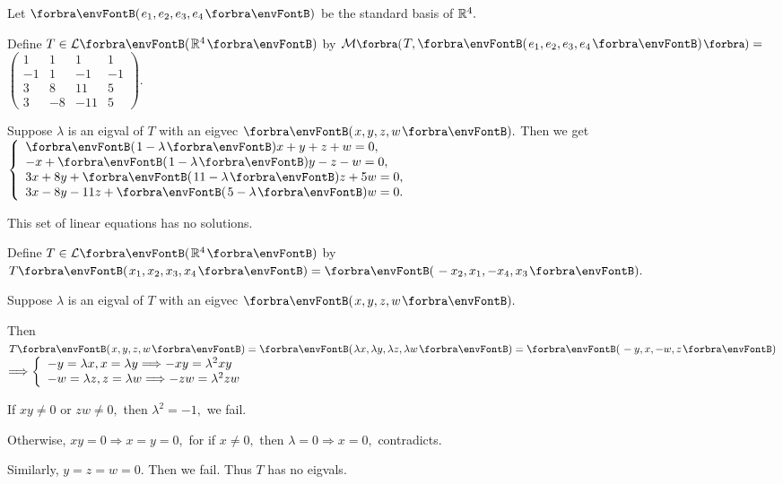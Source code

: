 \documentclass[a4paper, 11pt, UTF8]{article}
\begin{document}
\begin{large}
\par\quad
Let $\Par{e_1,e_2,e_3,e_4}$ be the standard basis of $\Rbb^4.$\vspace{-8pt}\par\quad
Define $T\in\Lm{\Rbb^4}$ by $\Mt[\BigPar]{T,\Par{e_1,e_2,e_3,e_4}}=${\small$\begin{pmatrix}
		1 & 1 & 1 & 1\\
		-1 & 1 & -1 & -1\\
		3 & 8 & 11 & 5\\
		3 & -8 & -11 & 5
	\end{pmatrix}.$}\vspace{-15pt}\par\quad
Suppose $\lambda$ is an eigval of $T$ with an eigvec $\Par{x,y,z,w}.$ Then we get {\small$\MathLeftBrace{l}{
		\Par{1-\lambda}x+y+z+w=0,\\
		-x+\Par{1-\lambda}y-z-w=0,\\
		3x+8y+\Par{11-\lambda}z+5w=0,\\
		3x-8y-11 z+\Par{5-\lambda}w=0.}$}\vspace{-10pt}\par\quad
This set of linear equations has no solutions.\par\quad
{}\large\par\vspace{6pt}\quad
\Or Define $T\in\Lm{\Rbb^4}$ by $T\Par{x_1,x_2,x_3,x_4}=\Par{-x_2,x_1,-x_4,x_3}.$\par\quad
Suppose $\lambda$ is an eigval of $T$ with an eigvec $\Par{x,y,z,w}.$\par\quad
Then $T\Par{x,y,z,w}=\Par{\lambda x,\lambda y,\lambda z,\lambda w}=\Par{-y,x,-w,z}$ {\normalsize $\Longrightarrow\MathLeftBrace{l}{
		-y=\lambda x,x=\lambda y\Longrightarrow-xy=\lambda^2 xy\\
		-w=\lambda z,z=\lambda w\Longrightarrow-zw=\lambda^2 zw}$}\par\quad
If $xy\neq 0$ or $zw\neq 0,$ then $\lambda^2=-1,$ we fail.\par\quad
Otherwise, $xy=0\Rightarrow x=y=0,$ for if $x\neq 0,$ then $\lambda=0\Rightarrow x=0,$ contradicts.\par\quad
Similarly, $y=z=w=0.$ Then we fail. Thus $T$ has no eigvals.\PfEnd
\SepLine


\end{large}
\end{document}
